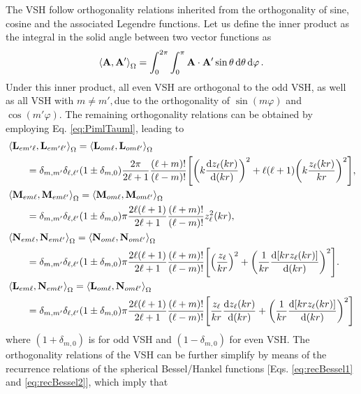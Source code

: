 The VSH follow orthogonality relations inherited from the orthogonality of sine, cosine and the associated Legendre functions. Let us define the inner product as the integral in the solid angle between two vector functions as
%
\begin{align}
\ev{\vb{A},\vb{A}'}_\Omega = \int_0^{2\pi}\int_0^{\pi} \vb{A}\cdot\vb{A}'\sin\theta\dd{\theta}\dd{\varphi}.
\label{eq:inner}
\end{align}
%
Under this inner product, all even VSH are orthogonal to the odd VSH, as well as all VSH  with $m\neq m', $due to the orthogonality of $\sin(m\varphi)$ and $\cos(m'\varphi)$. The remaining orthogonality relations  can be obtained by employing Eq. \eqref{eq:PimlTauml}, leading to
%
\begin{align}
&\ev{\vb{L}_{em'\ell},\vb{L}_{em'\ell'}}_\Omega = \ev{\vb{L}_{om\ell},\vb{L}_{om\ell'}}_\Omega \notag\\
	 &\hspace*{2em} =
 	\delta_{m,m'}\delta_{\ell,\ell'} (1\pm\delta_{m,0})
 	\frac{2\pi}{2\ell+1}\frac{(\ell+m)!}{(\ell-m)!}
 	\qty[\qty(k\dv{z_\ell(kr)}{(kr)})^2 + \ell(\ell+1)\qty(k\frac{z_\ell(kr)}{kr})^2],\\
%
&\ev{\vb{M}_{em\ell},\vb{M}_{em\ell'}}_\Omega = \ev{\vb{M}_{om\ell},\vb{M}_{om\ell'}}_\Omega \notag\\
		 &\hspace*{2em} =
	\delta_{m,m'}\delta_{\ell,\ell'} (1\pm\delta_{m,0})
	\pi \frac{2  \ell(\ell+1)}{2\ell+1}\frac{(\ell+m)!}{(\ell-m)!}
	z_{\ell}^2(kr),\\
%
&\ev{\vb{N}_{em\ell},\vb{N}_{em\ell'}}_\Omega = \ev{\vb{N}_{om\ell},\vb{N}_{om\ell'}}_\Omega  \notag\\
	 &\hspace*{2em} =
	 \delta_{m,m'}\delta_{\ell,\ell'} (1\pm\delta_{m,0})
	\pi \frac{2  \ell(\ell+1)}{2\ell+1}\frac{(\ell+m)!}{(\ell-m)!}
	\qty[\qty(\frac{ z_{\ell}}{kr})^2 + \qty(\frac{1}{kr}\dv{[kr z_\ell(kr)]}{(kr)})^2]. \\
&\ev{\vb{L}_{em\ell},\vb{N}_{em\ell'}}_\Omega = \ev{\vb{L}_{om\ell},\vb{N}_{om\ell'}}_\Omega \notag\\
	 &\hspace*{2em} =
	 \delta_{m,m'}\delta_{\ell,\ell'} (1\pm\delta_{m,0})
	\pi \frac{2  \ell(\ell+1)}{2\ell+1}\frac{(\ell+m)!}{(\ell-m)!}
	\qty[\frac{ z_{\ell}}{kr}\dv{z_\ell(kr)}{(kr)} + \qty(\frac{1}{kr}\dv{[kr z_\ell(kr)]}{(kr)})^2]
\end{align}
%
where $(1+\delta_{m,0}) $ is for odd VSH and $(1-\delta_{m,0}) $ for even VSH. The orthogonality relations of the VSH can be further simplify by means of the recurrence relations of the spherical Bessel/Hankel functions [Eqs. \eqref{eq:recBessel1} and \eqref{eq:recBessel2}], which imply that
